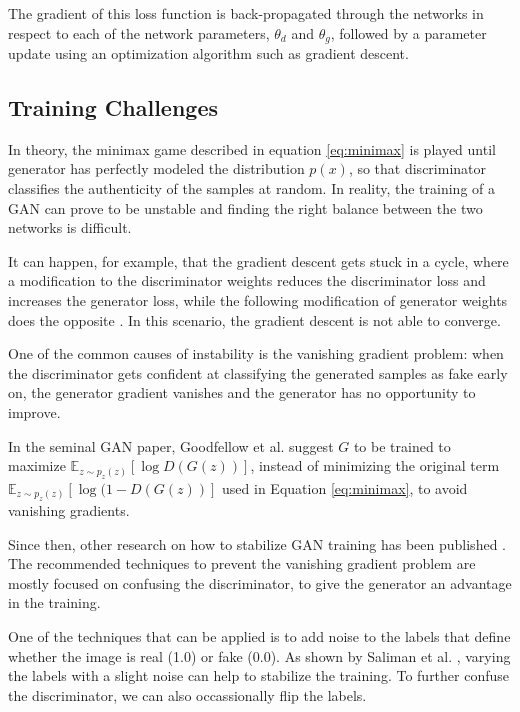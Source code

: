 \documentclass[12pt]{report}
\begin{document}
The gradient of this loss function is back-propagated through the networks in respect to each of the network parameters, $\theta_{d}$ and $\theta_{g}$, followed by a parameter update using an optimization algorithm such as gradient descent.

\subsection{Training Challenges} \label{sec:gan_diff}

In theory, the minimax game described in equation \ref{eq:minimax} is played until generator has perfectly modeled the distribution $p(x)$, so that discriminator classifies the authenticity of the samples at random. In reality, the training of a GAN can prove to be unstable and finding the right balance between the two networks is difficult.

It can happen, for example, that the gradient descent gets stuck in a cycle, where a modification to the discriminator weights reduces the discriminator loss and increases the generator loss, while the following modification of generator weights does the opposite \cite{salimans_improved_2016}. In this scenario, the gradient descent is not able to converge.

One of the common causes of instability is the vanishing gradient problem: when the discriminator gets confident at classifying the generated samples as fake early on, the generator gradient vanishes and the generator has no opportunity to improve. 

In the seminal GAN paper, Goodfellow et al. \cite{goodfellow_generative_2014} suggest $G$ to be trained to maximize $\mathbb{E}_{z \sim p_{z}(z)}[\log D(G(z))]$, instead of minimizing the original term $\mathbb{E}_{z \sim p_{z}(z)}[\log (1 - D(G(z))]$ used in Equation \ref{eq:minimax}, to avoid vanishing gradients. 

Since then, other research on how to stabilize GAN training has been published \cite{arjovsky_towards_2017}\cite{roth_stabilizing_2017}\cite{salimans_improved_2016}. The recommended techniques to prevent the vanishing gradient problem are mostly focused on confusing the discriminator, to give the generator an advantage in the training. 

One of the techniques that can be applied is to add noise to the labels that define whether the image is real (1.0) or fake (0.0). As shown by Saliman et al. \cite{salimans_improved_2016}, varying the labels with a slight noise can help to stabilize the training. To further confuse the discriminator, we can also occassionally flip the labels. 
\end{document}
